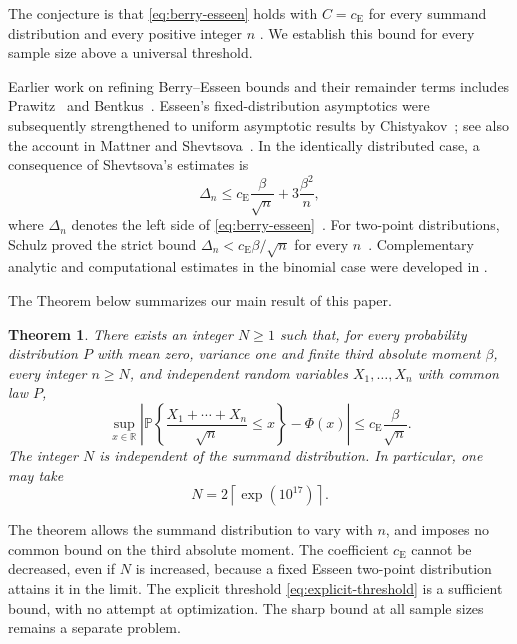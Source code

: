\documentclass[aop]{imsart}
\theoremstyle{plain}
\newtheorem{theorem}{Theorem}[section]
\theoremstyle{definition}
\theoremstyle{definition}
\newcommand{\PP}{\mathbb P}
\newcommand{\R}{\mathbb R}
\newcommand{\ce}{c_{\mathrm E}}
\begin{document}
The conjecture is that \eqref{eq:berry-esseen} holds with \(C=\ce\)
for every summand distribution and every positive integer \(n\) \cite{Zolotarev1966,ZolotukhinNagaevChebotarev2018}.
We establish this bound for every sample size above a universal threshold.

Earlier work on refining Berry--Esseen bounds and their remainder
terms includes Prawitz~\cite{Prawitz1975} and Bentkus~\cite{Bentkus1994}.
Esseen's fixed-distribution asymptotics were subsequently strengthened to uniform asymptotic results by Chistyakov~\cite{Chistyakov2002a,Chistyakov2002b,Chistyakov2003}; see also the account in Mattner and Shevtsova~\cite{MattnerShevtsova2019}. In the identically distributed case, a consequence of Shevtsova's estimates is
\[
 \Delta_n\le \ce\frac{\beta}{\sqrt n}+3\frac{\beta^2}{n},
\]
where \(\Delta_n\) denotes the left side of \eqref{eq:berry-esseen}~\cite[Corollary~4.18, p.~302]{Shevtsova2012}. For two-point distributions, Schulz proved the strict bound \(\Delta_n<\ce\beta/\sqrt n\) for every \(n\)~\cite[Theorem~1, p.~1]{Schulz2016}.
Complementary analytic and computational estimates in the binomial
case were developed in \cite{ZolotukhinNagaevChebotarev2018}.

The Theorem below summarizes our main result of this paper. 
\begin{theorem}\label{thm:main}
There exists an integer \(N\ge1\) such that, for every probability distribution \(P\) with mean zero, variance one and finite third absolute moment \(\beta\), every integer \(n\ge N\), and independent random variables \(X_1,\ldots,X_n\) with common law \(P\),
\[
 \sup_{x\in\R}\left|
 \PP\left\{\frac{X_1+\cdots+X_n}{\sqrt n}\le x\right\}-\Phi(x)
 \right|
 \le \ce\frac{\beta}{\sqrt n}.
\]
The integer \(N\) is independent of the summand distribution. In particular, one may take
\begin{equation}\label{eq:explicit-threshold}
 N=2\left\lceil\exp(10^{17})\right\rceil.
\end{equation}
\end{theorem}

The theorem allows the summand distribution to vary with \(n\), and imposes no common bound on the third absolute moment. The coefficient \(\ce\) cannot be decreased, even if \(N\) is increased, because a fixed Esseen two-point distribution attains it in the limit. The explicit threshold \eqref{eq:explicit-threshold} is a sufficient bound, with no attempt at optimization. The sharp bound at all sample sizes remains a separate problem.
\end{document}
